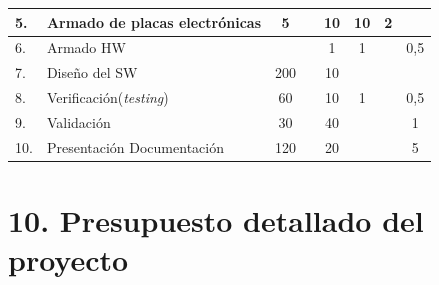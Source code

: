 \documentclass[11pt]{charter}
\begin{document}
\begin{table}[htpb]
\begin{tabularx}{\linewidth}{@{}|p{1.5em}|X|c|c|c|c|c|c|@{}}
5.& Armado de placas electrónicas  & \cellcolor[HTML]{A0A0C0}5&\cellcolor[HTML]{A0A0A0}& \cellcolor[HTML]{A0A0C0}10&\cellcolor[HTML]{A0B0B0}10&
\cellcolor[HTML]{A0A0C0}2&\cellcolor[HTML]{B0B0B0}
\\ \hline

6.& Armado HW & \cellcolor[HTML]{A0A0C0}&\cellcolor[HTML]{A0A0A0}& \cellcolor[HTML]{A0A0C0}1&\cellcolor[HTML]{A0B0B0}1&
\cellcolor[HTML]{A0A0C0}&\cellcolor[HTML]{B0B0B0}0,5
\\ \hline

7.& Diseño del SW  & \cellcolor[HTML]{A0A0C0}200&\cellcolor[HTML]{A0A0A0}& \cellcolor[HTML]{A0A0C0}10&\cellcolor[HTML]{A0B0B0}&
\cellcolor[HTML]{A0A0C0}&\cellcolor[HTML]{B0B0B0}
\\ \hline

8.& Verificación(\textit{testing})& \cellcolor[HTML]{A0A0C0}60&\cellcolor[HTML]{A0A0A0}& \cellcolor[HTML]{A0A0C0}10&\cellcolor[HTML]{A0B0B0}1&
\cellcolor[HTML]{A0A0C0}&\cellcolor[HTML]{B0B0B0}0,5
\\ \hline

9.& Validación  & \cellcolor[HTML]{A0A0C0}30&\cellcolor[HTML]{A0A0A0}& \cellcolor[HTML]{A0A0C0}40&\cellcolor[HTML]{A0B0B0}&
\cellcolor[HTML]{A0A0C0}&\cellcolor[HTML]{B0B0B0}1
\\ \hline

10.& Presentación Documentación  & \cellcolor[HTML]{A0A0C0}120&\cellcolor[HTML]{A0A0A0}& \cellcolor[HTML]{A0A0C0}20&\cellcolor[HTML]{A0B0B0}&
\cellcolor[HTML]{A0A0C0}&\cellcolor[HTML]{B0B0B0}5
\\ \hline
\end{tabularx}
\end{table}

\vspace{40em}


\section{10. Presupuesto detallado del proyecto}
\label{sec:presupuesto}

\end{document}

